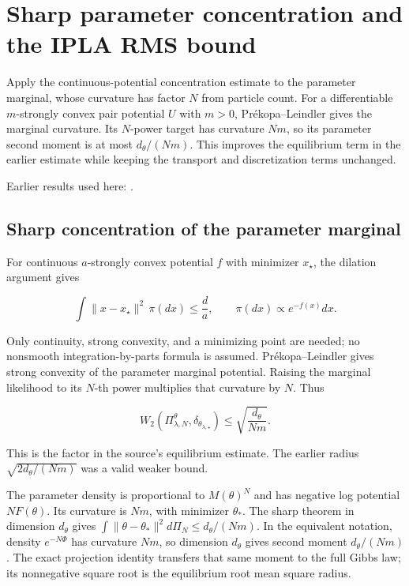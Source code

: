 \documentclass[11pt,a4paper]{report}
\begin{document}
\section{\texorpdfstring{Sharp parameter concentration and the IPLA RMS bound}{Sharp parameter concentration and the IPLA RMS bound}}
\label{proof-module-ProximalLangevin-SharpIPLA-lean}


Apply the continuous-potential concentration estimate to the parameter marginal, whose curvature has factor \(N\) from particle count. For a differentiable \(m\)-strongly convex pair potential \(U\) with \(m>0\), Prékopa–Leindler gives the marginal curvature. Its \(N\)-power target has curvature \(Nm\), so its parameter second moment is at most \(d_\theta/(Nm)\). This improves the equilibrium term in the earlier estimate while keeping the transport and discretization terms unchanged.



Earlier results used here: \cite[Section~3.19]{LangevinLean2026IPLA}.
\subsection{\texorpdfstring{Sharp concentration of the parameter marginal}{Sharp concentration of the parameter marginal}}
\label{report-step-ProximalLangevin-SharpIPLA-lean-1}


For continuous \(a\)-strongly convex potential \(f\) with minimizer \(x_\star\), the dilation argument gives

\[
\int\|x-x_\star\|^2\,\pi(dx)\le\frac d a,
\qquad\pi(dx)\propto e^{-f(x)}dx.
\]

Only continuity, strong convexity, and a minimizing point are needed; no nonsmooth integration-by-parts formula is assumed. Prékopa–Leindler gives strong convexity of the parameter marginal potential. Raising the marginal likelihood to its \(N\)-th power multiplies that curvature by \(N\). Thus

\[
W_2(\Pi_{\lambda,N}^{\theta},\delta_{\theta_{\lambda,\star}})
\le\sqrt{\frac{d_\theta}{Nm}}.
\]

This is the factor in the source’s equilibrium estimate. The earlier radius \(\sqrt{2d_\theta/(Nm)}\) was a valid weaker bound.



The parameter density is proportional to \(M(\theta)^N\) and has negative log potential \(NF(\theta)\). Its curvature is \(Nm\), with minimizer \(\theta_*\). The sharp theorem in dimension \(d_\theta\) gives \(\int\|\theta-\theta_*\|^2d\Pi_N\le d_\theta/(Nm)\). In the equivalent notation, density \(e^{-N\Phi}\) has curvature \(Nm\), so dimension \(d_\theta\) gives second moment \(d_\theta/(Nm)\). The exact projection identity transfers that same moment to the full Gibbs law; its nonnegative square root is the equilibrium root mean square radius.
\end{document}
